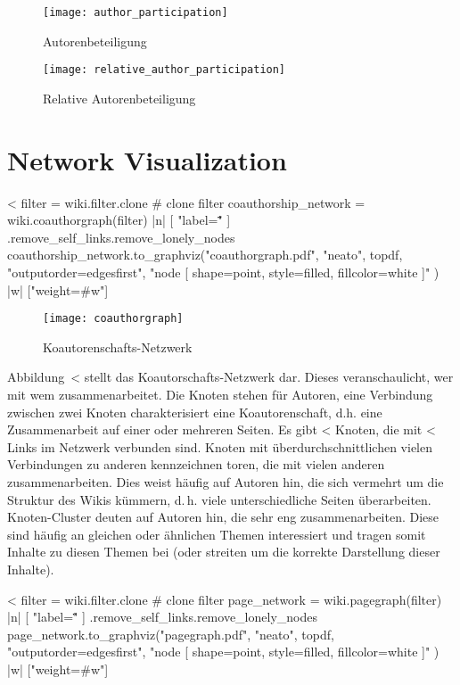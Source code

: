 \documentclass{scrartcl}
\begin{document}
\begin{figure}
  \texttt{[image: author\_participation]}
  \caption{Autorenbeteiligung}
  \label{fig:author_participation}
  \vfill

  \texttt{[image: relative\_author\_participation]}
  \caption{Relative Autorenbeteiligung}
  \label{fig:relative_author_participation}
\end{figure}


\section{Network Visualization} %
\label{sec:network_visualization}

<%
filter = wiki.filter.clone # clone filter
coauthorship_network = wiki.coauthorgraph(filter) { |n| [ "label=\"\"" ] }.remove_self_links.remove_lonely_nodes
coauthorship_network.to_graphviz("coauthorgraph.pdf", "neato", topdf, "outputorder=edgesfirst", "node [ shape=point, style=filled, fillcolor=white ]" ) { |w|  ["weight=#{w}"] }
\begin{figure}[htbp]
	\centering
	\texttt{[image: coauthorgraph]}
	\caption{Koautorenschafts-Netzwerk}
	\label{fig:coauthorship_network}
\end{figure}

Abbildung~<%
stellt das Koautorschafts-Netzwerk dar. Dieses veranschaulicht, wer mit wem zusammenarbeitet. 
Die Knoten stehen für Autoren, eine Verbindung zwischen zwei Knoten charakterisiert eine Koautorenschaft, d.h. eine Zusammenarbeit auf einer oder mehreren Seiten.
Es gibt <%
Knoten, die mit <%
Links im Netzwerk verbunden sind. 
Knoten mit überdurchschnittlichen vielen Verbindungen zu anderen kennzeichnen toren, die mit vielen anderen zusammenarbeiten. Dies weist häufig auf Autoren hin, die sich vermehrt um die Struktur des Wikis kümmern, d.\,h. viele unterschiedliche Seiten überarbeiten. Knoten-Cluster deuten auf Autoren hin, die sehr eng zusammenarbeiten. Diese sind häufig an gleichen oder ähnlichen Themen interessiert und tragen somit Inhalte zu diesen Themen bei (oder streiten um die korrekte Darstellung dieser Inhalte).


<%
filter = wiki.filter.clone # clone filter
page_network = wiki.pagegraph(filter) { |n| [ "label=\"\"" ] }.remove_self_links.remove_lonely_nodes
page_network.to_graphviz("pagegraph.pdf", "neato", topdf, "outputorder=edgesfirst", "node [ shape=point, style=filled, fillcolor=white ]" ) { |w|  ["weight=#{w}"] }
\end{document}
